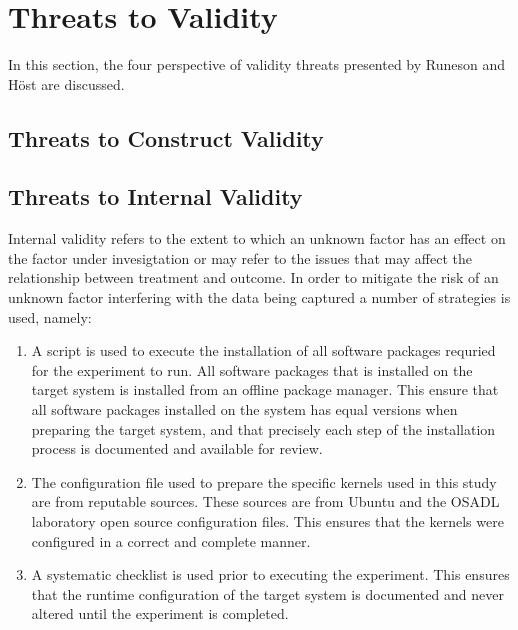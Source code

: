 \iffalse  \fi
\chapter{Threats to Validity}
In this section, the four perspective of validity threats presented by Runeson and H\"{o}st \cite{runeson} are discussed.

\section{Threats to Construct Validity}
\section{Threats to Internal Validity}
Internal validity refers to the extent to which an unknown factor has an effect on the factor under invesigtation or may refer to the issues that may affect the relationship between treatment and outcome. In order to mitigate the risk of an unknown factor interfering with the data being captured a number of strategies is used, namely: \\
\begin{enumerate}
\item{A script is used to execute the installation of all software packages requried for the experiment to run. All software packages that is installed on the target system is installed from an offline package manager. This ensure that all software packages installed on the system has equal versions when preparing the target system, and that precisely each step of the installation process is documented and available for review.}
\item{The configuration file used to prepare the specific kernels used in this study are from reputable sources. These sources are from Ubuntu and the OSADL laboratory open source configuration files. This ensures that the kernels were configured in a correct and complete manner.}
\item{A systematic checklist is used prior to executing the experiment. This ensures that the runtime configuration of the target system is documented and never altered until the experiment is completed.}
\end{enumerate}


